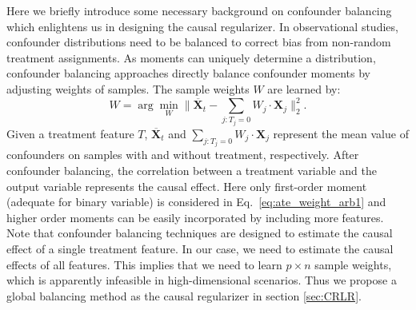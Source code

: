 \documentclass[sigconf]{acmart}
\begin{document}
Here we briefly introduce some necessary background on confounder balancing which enlightens us in designing the causal regularizer.
In observational studies, confounder distributions need to be balanced to correct bias from non-random treatment assignments.
As moments can uniquely determine a distribution, confounder balancing approaches directly balance confounder moments by adjusting weights of samples\cite{hainmueller2011entropy,athey2016approximate,Kuang2017Estimating}.
The sample weights $W$ are learned by:
\begin{equation}
    \label{eq:ate_weight_arb1}
    {W = \arg \min_{W} \|\overline{\bm{X}}_t - \sum_{j:T_j=0}W_j\cdot \bm{X}_j\|^{2}_2.}
\end{equation}
Given a treatment feature $T$, $\overline{\bm{X}}_t$ and $\sum_{j:T_j=0}W_j\cdot \bm{X}_j$ represent the mean value of confounders on samples with and without treatment, respectively.
After confounder balancing, the correlation between a treatment variable and the output variable represents the causal effect.
Here only first-order moment (adequate for binary variable) is considered in Eq.~\ref{eq:ate_weight_arb1} and higher order moments can be easily incorporated by including more features.
Note that confounder balancing techniques are designed to estimate the causal effect of a single treatment feature.
In our case, we need to estimate the causal effects of all features.
This implies that we need to learn $p \times n$ sample weights, which is apparently infeasible in high-dimensional scenarios.
Thus we propose a global balancing method as the causal regularizer in section \ref{sec:CRLR}.
\end{document}
